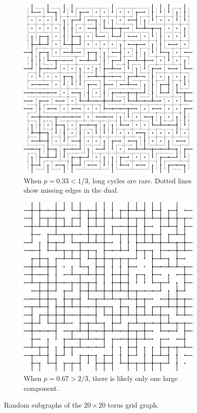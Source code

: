 \documentclass{patmorin}
\begin{document}
\begin{figure}
  \centering
  \begin{subfigure}[t]{0.4\textwidth}
    \includegraphics{torusrare}
    \caption{When $p = 0.33 < 1/3$, long cycles are rare. Dotted lines show
      missing edges in the dual.}
  \end{subfigure}
  \quad\quad
  \begin{subfigure}[t]{0.4\textwidth}
    \includegraphics{torusdense}
    \caption{When $p = 0.67 > 2/3$, there is likely only one large
      component.}
  \end{subfigure}
  \caption{Random subgraphs of the $20 \times 20$ torus grid graph.}
\end{figure}
\end{document}
